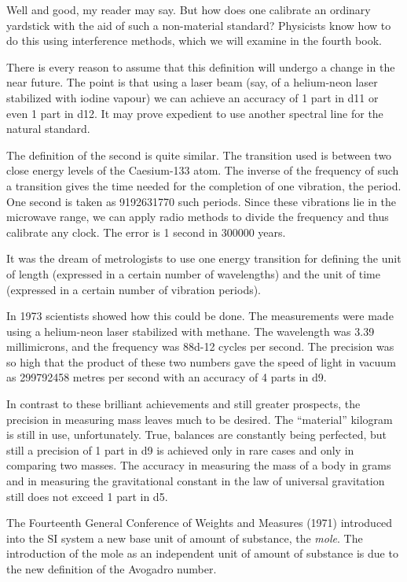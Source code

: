 Well and good, my reader may say. But how does one calibrate an
ordinary yardstick with the aid of such a non-material standard?
Physicists know how to do this using interference methods, which we
will examine in the fourth book. 

There is every reason to assume that this definition will undergo a
change in the near future. The point is that using a laser beam (say,
of a helium-neon laser stabilized with iodine vapour) we can achieve
an accuracy of 1 part in \num{d11} or even 1 part in \num{d12}. It may
prove expedient to use another spectral line for the natural standard.

The definition of the second is quite similar. The transition used
is between two close energy levels of the Caesium-133 atom. The
inverse of the frequency of such a transition gives the time needed
for the completion of one vibration, the period. One second is taken
as \num{9192631770} such periods. Since these vibrations lie in the
microwave range, we can apply radio methods to divide the frequency
and thus calibrate any clock. The error is 1 second in \num{300000} years.


It was the dream of metrologists to use one energy transition for
defining the unit of length (expressed in a certain number of
wavelengths) and the unit of time (expressed in a certain number of
vibration periods).  

In 1973 scientists showed how this could be done. The measurements
were made using a helium-neon laser stabilized with methane. The
wavelength was 3.39 millimicrons, and the frequency was \num{88d-12}
cycles per second. The precision was so high that the product of these
two numbers gave the speed of light in vacuum as \num{299792458} metres
per second with an accuracy of 4 parts in \num{d9}. 
\label{sec-def}

In contrast to these brilliant achievements and still greater
prospects, the precision in measuring mass leaves much to be
desired. The ``material'' kilogram is still in use,
unfortunately. True, balances are constantly being perfected, but
still a precision of 1 part in \num{d9} is achieved only in rare cases and
only in comparing two masses.  The accuracy in measuring the mass of a
body in grams and in measuring the gravitational constant in the law
of universal gravitation still does not exceed 1 part in \num{d5}.

The Fourteenth General Conference of Weights and Measures (1971)
introduced into the SI system a new base unit of amount of substance,
the \emph{mole}. The introduction of the mole as an independent unit
of amount of substance is due to the new definition of the Avogadro
number.

